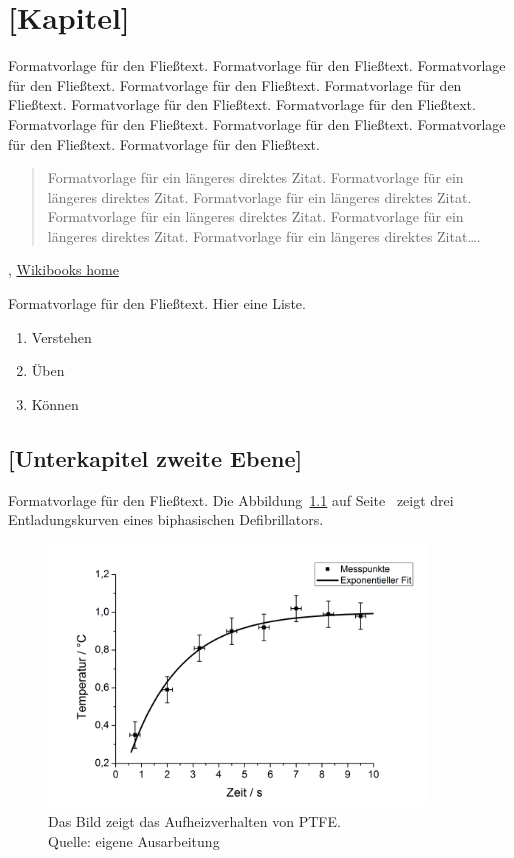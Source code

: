 \chapter{[Kapitel]}
Formatvorlage für den Fließtext. Formatvorlage für den Fließtext. Formatvorlage für den Fließtext. Formatvorlage für den Fließtext. Formatvorlage für den Fließtext. Formatvorlage für den Fließtext. Formatvorlage für den Fließtext. Formatvorlage für den Fließtext. Formatvorlage für den Fließtext. Formatvorlage für den Fließtext. Formatvorlage für den Fließtext.
\begin{quote}
  Formatvorlage für ein längeres direktes Zitat. Formatvorlage für ein längeres direktes Zitat. Formatvorlage für ein längeres direktes Zitat. Formatvorlage für ein längeres direktes Zitat. Formatvorlage für ein längeres direktes Zitat. Formatvorlage für ein längeres direktes Zitat….
\end{quote}

, \href{https://www.wikibooks.org}{Wikibooks home}

Formatvorlage für den Fließtext.
Hier eine Liste.
\begin{enumerate}
 \item Verstehen
 \item Üben
 \item Können
\end{enumerate}


\section{[Unterkapitel zweite Ebene]}
Formatvorlage für den Fließtext. Die Abbildung~\ref{fig:ex} auf Seite~\pageref{fig:ex} zeigt drei Entladungskurven eines biphasischen Defibrillators.
\begin{figure}[htb]
  \centering
  \includegraphics[width=10cm]{Amann_TechnAbb}
  \caption[Aufheizverhalten von PTFE]{Das Bild zeigt das Aufheizverhalten von PTFE\@. \\Quelle: eigene Ausarbeitung}\label{fig:ex}
\end{figure}


